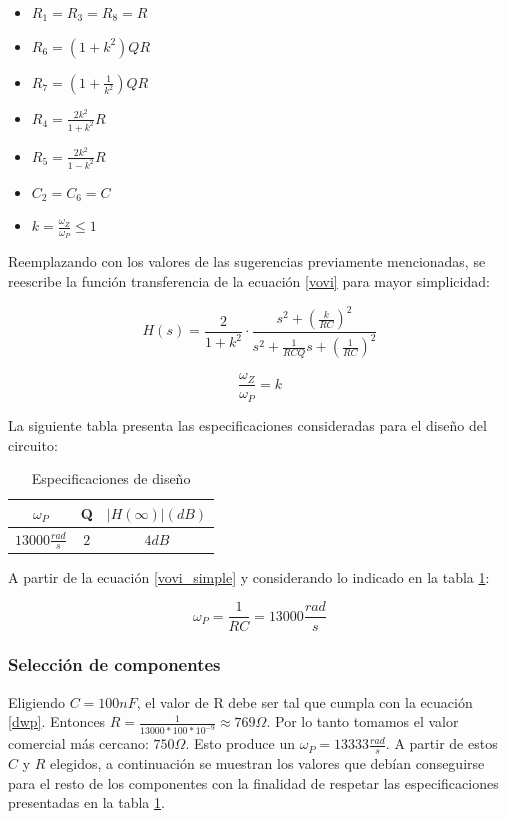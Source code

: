 \begin{itemize}
	\item $R_1 = R_3 = R_8 = R$
	\item $R_6 = (1 + k^2) Q R$
	\item $R_7 = (1 + \frac{1}{k^2})Q R$
	\item $R_4 = \frac{2k^2}{1+k^2}R$
	\item $R_5 = \frac{2k^2}{1-k^2}R$
	\item $C_2 = C_6 = C$
	\item $k = \frac{\omega_Z}{\omega_P} \leqslant 1 $
\end{itemize}

Reemplazando con los valores de las sugerencias previamente mencionadas, se reescribe la funci\'on transferencia de la ecuaci\'on \ref{vovi} para mayor simplicidad:

\begin{equation}
H(s) = \frac{2}{1+k^2} \cdot \frac{s^2 + \left( \frac{k}{RC}\right)^2}{s^2 + \frac{1}{RCQ} s + \left(\frac{1}{RC}\right)^2}
\label{vovi_simple}
\end{equation}

\begin{equation}
\frac{\omega_Z}{\omega_P} = k
\end{equation}

La siguiente tabla presenta las especificaciones consideradas para el dise\~no del circuito:

\begin{table}[h!]
	\centering
	\begin{tabular}{c c c}%
		\bfseries $\omega_P$ & Q & $|H(\infty)| (dB)$ \\ \hline
		$13000 \frac{rad}{s}$ & $2$ & $4dB$\\
		\hline
	\end{tabular}
	\caption{Especificaciones de dise\~no}
	\label{especificaciones}
\end{table}

A partir de la ecuaci\'on \ref{vovi_simple} y considerando lo indicado en la tabla \ref{especificaciones}:

\begin{equation}
\omega_P = \frac{1}{RC} = 13000\frac{rad}{s}
\label{dwp}
\end{equation}


\subsubsection{Selecci\'on de componentes}
Eligiendo $C = 100nF$, el valor de R debe ser tal que cumpla con la ecuaci\'on \ref{dwp}. Entonces $R = \frac{1}{13000 * 100 *10^{-9}} \approx 769\Omega.$ Por lo tanto tomamos el valor comercial m\'as cercano: $750\Omega$. Esto produce un $\omega_P = 13333 \frac{rad}{s}$. A partir de estos $C$ y $R$ elegidos, a continuaci\'on se muestran los valores que deb\'ian conseguirse para el resto de los componentes con la finalidad de respetar las especificaciones presentadas en la tabla \ref{especificaciones}.

